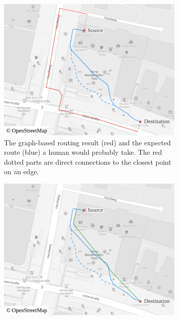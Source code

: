 			\begin{figure}[h!]
				\begin{minipage}[t]{.48\textwidth}
					\begin{subfigure}[t]{\linewidth}
						\begin{figcenter}
							\includegraphics[width=\textwidth]{images/qgis-routing-osterstrasse-expected-vs-routing}
						\end{figcenter}
						\caption{The graph-based routing result (red) and the expected route (blue) a human would probably take. The red dotted parts are direct connections to the closest point on an edge.}
						\label{fig:eval-osterstrasse-route-expected}
					\end{subfigure}
				\end{minipage}
				\hfill
				\begin{minipage}[t]{.48\textwidth}
					\begin{subfigure}[t]{\linewidth}
						\begin{figcenter}
							\includegraphics[width=\textwidth]{images/qgis-routing-osterstrasse-expected-vs-actual}

\end{figcenter}
\end{subfigure}
\end{minipage}
\end{figure}
